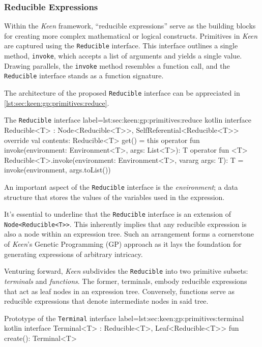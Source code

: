 \subsubsection{Reducible Expressions}
  Within the \textit{Keen} framework, \enquote{reducible expressions} serve as
  the building blocks for creating more complex mathematical or logical 
  constructs. Primitives in \textit{Keen} are captured using the 
  \texttt{Reducible} interface. This interface outlines a single method, 
  \texttt{invoke}, which accepts a list of arguments and yields a single 
  value. Drawing parallels, the \texttt{invoke} method resembles a function 
  call, and the \texttt{Reducible} interface stands as a function signature.

  The architecture of the proposed \texttt{Reducible} interface can be 
  appreciated in \vref{lst:sec:keen:gp:primitives:reduce}.

  \begin{code}{
    The \texttt{Reducible} interface
  }{
    label=lst:sec:keen:gp:primitives:reduce
  }{kotlin}
    interface Reducible<T> : Node<Reducible<T>>, SelfReferential<Reducible<T>> {
        override val contents: Reducible<T> get() = this
        operator fun invoke(environment: Environment<T>, args: List<T>): T
        operator fun <T> Reducible<T>.invoke(environment: Environment<T>, vararg args: T): T =
            invoke(environment, args.toList())
    }
  \end{code}

  An important aspect of the \texttt{Reducible} interface is the 
  \emph{environment}; a data structure that stores the values of the
  variables used in the expression.
  
  It's essential to underline that the \texttt{Reducible} interface is an 
  extension of \texttt{Node<Reducible<T>>}. This inherently implies that any 
  reducible expression is also a node within an expression tree. Such an 
  arrangement forms a cornerstone of \textit{Keen}'s Genetic Programming (GP) 
  approach as it lays the foundation for generating expressions of arbitrary 
  intricacy.

  Venturing forward, \textit{Keen} subdivides the \texttt{Reducible} into 
  two primitive subsets: \emph{terminals} and \emph{functions}. The former, 
  terminals, embody reducible expressions that act as leaf nodes in an 
  expression tree. 
  Conversely, functions serve as reducible expressions that denote 
  intermediate nodes in said tree.

  \begin{code}{Prototype of the \texttt{Terminal} interface}{
    label=lst:sec:keen:gp:primitives:terminal
  }{kotlin}
    interface Terminal<T> : Reducible<T>, Leaf<Reducible<T>> {
        fun create(): Terminal<T>
    }
  \end{code}

